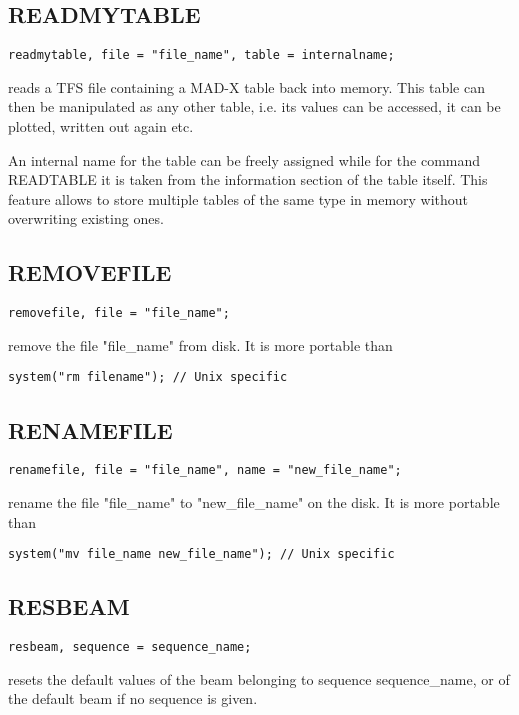 \subsection{READMYTABLE}
\label{subsec:general_readmy}
\begin{verbatim}
readmytable, file = "file_name", table = internalname;
\end{verbatim} 
reads a TFS file containing a MAD-X table back into memory. This table
can then be manipulated as any other table, i.e. its values can be
accessed, it can be plotted, written out again etc. 

An internal name for
the table can be freely assigned while for the command READTABLE it is
taken from the information section of the table itself. This feature
allows to store multiple tables of the same type in memory without
overwriting existing ones.   


\subsection{REMOVEFILE}
\begin{verbatim}
removefile, file = "file_name";
\end{verbatim} 
remove the file "file\_name" from disk. It is more portable than  
\begin{verbatim}
system("rm filename"); // Unix specific
\end{verbatim}


\subsection{RENAMEFILE}
\begin{verbatim}
renamefile, file = "file_name", name = "new_file_name";
\end{verbatim} 
rename the file "file\_name" to "new\_file\_name" on the disk. It is more
portable than  
\begin{verbatim}
system("mv file_name new_file_name"); // Unix specific
\end{verbatim}

\subsection{RESBEAM}
\begin{verbatim}
resbeam, sequence = sequence_name;
\end{verbatim} 
resets the default values of the beam belonging to sequence sequence\_name, or
of the default beam if no sequence is given.  


